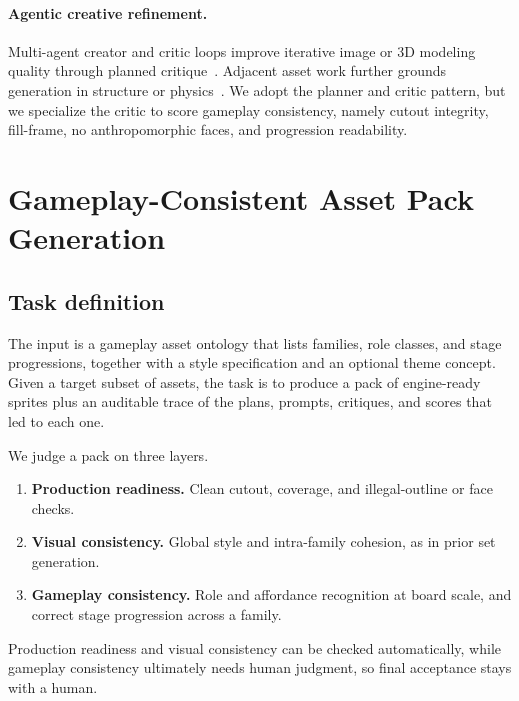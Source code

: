 \documentclass{article}
\begin{document}
\paragraph{Agentic creative refinement.}
Multi-agent creator and critic loops improve iterative image or 3D modeling quality through
planned critique~\cite{crea2025,planneractorcritic2026,scenecraft2024,shapecraft2025}.
Adjacent asset work further grounds generation in structure or physics~\cite{physx3d2025,neuralassets2024}.
We adopt the planner and critic pattern, but we specialize the critic to score gameplay
consistency, namely cutout integrity, fill-frame, no anthropomorphic faces, and progression
readability.

\section{Gameplay-Consistent Asset Pack Generation}
\label{sec:task}

\subsection{Task definition}
\label{sec:task-def}

The input is a gameplay asset ontology that lists families, role classes, and stage progressions,
together with a style specification and an optional theme concept.
Given a target subset of assets, the task is to produce a pack of engine-ready sprites plus an
auditable trace of the plans, prompts, critiques, and scores that led to each one.

We judge a pack on three layers.
\begin{enumerate}[leftmargin=*,itemsep=1pt]
  \item \textbf{Production readiness.} Clean cutout, coverage, and illegal-outline or face checks.
  \item \textbf{Visual consistency.} Global style and intra-family cohesion, as in prior set
        generation.
  \item \textbf{Gameplay consistency.} Role and affordance recognition at board scale, and
        correct stage progression across a family.
\end{enumerate}
Production readiness and visual consistency can be checked automatically, while gameplay
consistency ultimately needs human judgment, so final acceptance stays with a human.
\end{document}
